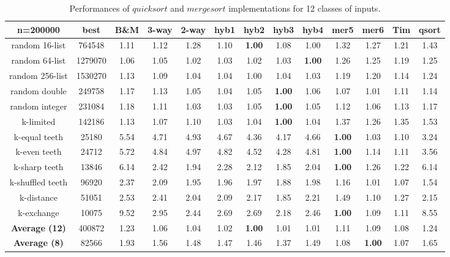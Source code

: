 \documentclass[AMA,STIX1COL]{WileyNJD-v2}
\newcommand{\qusort}{$quicksort$ }
\newcommand{\msort}{$mergesort$ }
\begin{document}
\begin{table}
\caption{Performances of \qusort and \msort implementations for 12 classes of inputs.}
\centering
\begin{tabular}{|c|c|c|c|c|c|c|c|c|c|c|c|c|}
\toprule
n=200000 & best  & B\&M & 3-way & 2-way & hyb1 & hyb2 & hyb3 & hyb4 & mer5& mer6 & Tim & qsort \\
\midrule
random 16-list	&764548	&1.11&	1.12&	1.28&	1.10&	\textbf{1.00}&	1.08&	1.00&	1.32&	1.27&	1.21&	1.43\\
random 64-list&	1279070	&1.06	&1.05	&1.02	&1.03	&1.02	&1.03	&\textbf{1.00}	&1.26	&1.25	&1.19	&1.25\\
random 256-list&	1530270&	1.13&	1.09&	1.04&	1.04&	1.00&	1.04&	1.03&	1.19&	1.20&	1.14&	1.24\\
random double&	249758	&1.17	&1.13	&1.05	&1.04	&1.05	&\textbf{1.00}	&1.06	&1.07	&1.01	&1.11	&1.14\\
random integer&	231084&	1.18&	1.11&	1.03&	1.03&	1.05&	\textbf{1.00}&	1.05&	1.12&	1.06&	1.13&	1.17\\
k-limited&	142186	&1.13	&1.07	&1.10	&1.03	&1.04	&\textbf{1.00}	&1.04	&1.37	&1.26	&1.35	&1.53\\
k-equal teeth&	25180&	5.54&	4.71&	4.93&	4.67&	4.36&	4.17&	4.66&	\textbf{1.00}&	1.03&	1.10&	3.24\\
k-even teeth&	24712	&5.72	&4.84	&4.97	&4.82	&4.52	&4.28	&4.81	&\textbf{1.00}	&1.14	&1.11&	3.56\\
k-sharp teeth&	13846	&6.14&	2.42&	1.94&	2.28&	2.12&	1.85&	2.04&	\textbf{1.00}&	1.26&	1.22&	6.14\\
k-shuffled teeth&	96920	&2.37	&2.09	&1.95	&1.96	&1.97	&1.88	&1.98	&1.16	&1.01	&1.07	&1.54\\
k-distance&	51051	&2.53&	2.41&	2.04&	2.09&	2.17&	1.85&	2.21&	1.49&	1.10&	1.27&	2.15\\
k-exchange&	10075	&9.52	&2.95	&2.44	&2.69	&2.69	&2.18	&2.46	&\textbf{1.00}	&1.09	&1.11	&8.55\\
\textbf{Average  (12)}&	400872&	1.23&	1.06&	1.04&	1.02&	\textbf{1.00}&	1.01&	1.01&	1.11&	1.09&	1.08&	1.24\\
\textbf{Average  (8)}&	82566	&1.93	&1.56	&1.48	&1.47	&1.46	&1.37	&1.49	&1.08	&\textbf{1.00}	&1.07	&1.65\\
\bottomrule
\end{tabular}
\label{table3}
\end{table}
\end{document}
